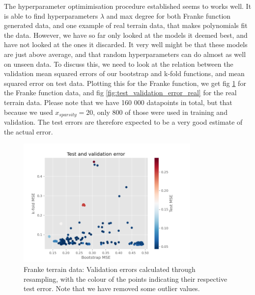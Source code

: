 \documentclass[11pt, a4paper]{report}
\begin{document}
The hyperparameter optimimisation procedure established seems to works well. It is able to find hyperparameters $\lambda$ and max degree for both Franke function generated data, and one example of real terrain data, that makes polynomials fit the data. However, we have so far only looked at the models it deemed best, and have not looked at the ones it discarded. It very well might be that these models are just above average, and that random hyperparameters can do almost as well on unseen data. To discuss this, we need to look at the relation between the validation mean squared errors of our bootstrap and k-fold functions, and mean squared error on test data. Plotting this for the Franke function, we get fig \ref{fig:test_validation_error_franke} for the Franke function data, and fig \ref{fig:test_validation_error_real} for the real terrain data. Please note that we have 160 000 datapoints in total, but that because we used $x_{sparsity} = 20$, only 800 of those were used in training and validation. The test errors are therefore expected to be a very good estimate of the actual error.

\begin{figure}
\begin{center}
\includegraphics[width=0.8\textwidth]{../plots/test_validation_error_franke.png}
\end{center}
\caption{Franke terrain data: Validation errors calculated through resampling, with the colour of the points indicating their respective test error. Note that we have removed some outlier values.}
\label{fig:test_validation_error_franke}
\end{figure}
\end{document}
